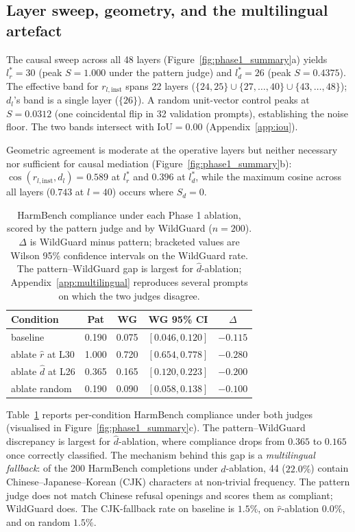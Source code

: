 \documentclass{article}
\newcommand{\rinst}{r_{l,\mathrm{inst}}}
\newcommand{\dinst}{d_{l}}
\begin{document}
\subsection{Layer sweep, geometry, and the multilingual artefact}

The causal sweep across all 48 layers
(Figure~\ref{fig:phase1_summary}a) yields $l^{*}_r = 30$ (peak
$S=1.000$ under the pattern judge) and $l^{*}_d = 26$ (peak
$S=0.4375$). The effective band for $\rinst$ spans 22 layers
($\{24,25\} \cup \{27,\ldots,40\}\cup \{43,\ldots,48\}$); $\dinst$'s band is a
single layer ($\{26\}$). A random unit-vector control peaks at
$S=0.0312$ (one coincidental flip in 32 validation prompts),
establishing the noise floor. The two bands intersect with
$\mathrm{IoU}=0.00$ (Appendix~\ref{app:iou}).

Geometric agreement is moderate at the operative layers but neither
necessary nor sufficient for causal mediation
(Figure~\ref{fig:phase1_summary}b): $\cos(\rinst, \dinst) = 0.589$
at $l^{*}_r$ and $0.396$ at $l^{*}_d$, while the maximum cosine
across all layers ($0.743$ at $l=40$) occurs where $S_d = 0$.

\begin{table}[t]
\caption{HarmBench compliance under each Phase 1 ablation, scored by
the pattern judge and by WildGuard ($n=200$). $\Delta$ is WildGuard
minus pattern; bracketed values are Wilson 95\% confidence intervals
on the WildGuard rate. The pattern--WildGuard gap is largest for
$\hat{d}$-ablation; Appendix~\ref{app:multilingual} reproduces
several prompts on which the two judges disagree.}
\label{tab:phase1_hb}
\centering
\small
\begin{tabular}{lcccc}
\toprule
Condition & Pat & WG & WG 95\% CI & $\Delta$ \\
\midrule
baseline                & 0.190 & 0.075 & $[0.046, 0.120]$ & $-0.115$ \\
ablate $\hat{r}$ at L30 & 1.000 & 0.720 & $[0.654, 0.778]$ & $-0.280$ \\
ablate $\hat{d}$ at L26 & 0.365 & 0.165 & $[0.120, 0.223]$ & $-0.200$ \\
ablate random           & 0.190 & 0.090 & $[0.058, 0.138]$ & $-0.100$ \\
\bottomrule
\end{tabular}
\end{table}

Table~\ref{tab:phase1_hb} reports per-condition HarmBench compliance
under both judges (visualised in Figure~\ref{fig:phase1_summary}c).
The pattern--WildGuard discrepancy is largest for $\hat{d}$-ablation,
where compliance drops from $0.365$ to $0.165$ once correctly
classified. The mechanism behind this gap is a \emph{multilingual
fallback}: of the 200 HarmBench completions under
$\hat{d}$-ablation, 44 ($22.0\%$) contain
Chinese--Japanese--Korean (CJK) characters at non-trivial frequency.
The pattern judge does not match Chinese refusal openings and
scores them as compliant; WildGuard does. The CJK-fallback rate on
baseline is $1.5\%$, on $\hat{r}$-ablation $0.0\%$, and on random
$1.5\%$.
\end{document}
